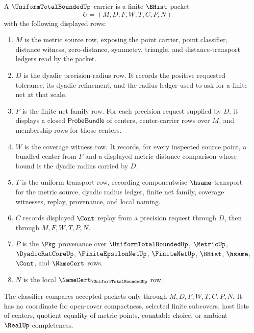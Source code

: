 \begin{definition}
\label{def:uniform-total-bounded-carrier}
A $\UniformTotalBoundedUp$ carrier is a finite $\BHist$ packet
$$
U=(M,D,F,W,T,C,P,N)
$$
with the following displayed rows:
\begin{enumerate}
\item $M$ is the metric source row, exposing the point carrier, point classifier, distance witness, zero-distance, symmetry, triangle, and distance-transport ledgers read by the packet.
\item $D$ is the dyadic precision-radius row. It records the positive requested tolerance, its dyadic refinement, and the radius ledger used to ask for a finite net at that scale.
\item $F$ is the finite net family row. For each precision request supplied by $D$, it displays a closed $\mathsf{ProbeBundle}$ of centers, center-carrier rows over $M$, and membership rows for those centers.
\item $W$ is the coverage witness row. It records, for every inspected source point, a bundled center from $F$ and a displayed metric distance comparison whose bound is the dyadic radius carried by $D$.
\item $T$ is the uniform transport row, recording componentwise $\hsame$ transport for the metric source, dyadic radius ledger, finite net family, coverage witnesses, replay, provenance, and local naming.
\item $C$ records displayed $\Cont$ replay from a precision request through $D$, then through $M,F,W,T,P,N$.
\item $P$ is the $\Pkg$ provenance over $\UniformTotalBoundedUp$, $\MetricUp$, $\DyadicRatCoreUp$, $\FiniteEpsilonNetUp$, $\FiniteNetUp$, $\BHist$, $\hsame$, $\Cont$, and $\NameCert$ rows.
\item $N$ is the local $\NameCert_{\UniformTotalBoundedUp}$ row.
\end{enumerate}
The classifier compares accepted packets only through $M,D,F,W,T,C,P,N$. It has no coordinate for open-cover compactness, selected finite subcovers, host lists of centers, quotient equality of metric points, countable choice, or ambient $\RealUp$ completeness.
\end{definition}

